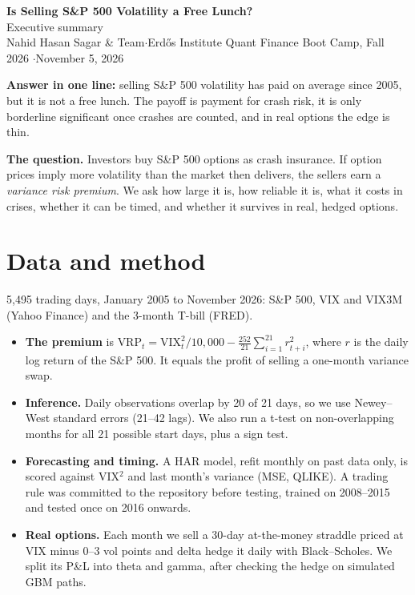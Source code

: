\documentclass[10pt]{article}
\begin{document}
\begin{center}
{\LARGE\bfseries\color{ink} Is Selling S\&P 500 Volatility a Free Lunch?}\\[4pt]
{\large Executive summary}\\[2pt]
Nahid Hasan Sagar \& Team\quad$\cdot$\quad Erd\H{o}s Institute Quant Finance Boot Camp, Fall 2026 \quad$\cdot$\quad November 5, 2026
\end{center}

\textbf{Answer in one line:} selling S\&P 500 volatility has paid on average since 2005, but it is not a free lunch. The payoff is payment for crash risk, it is only borderline significant once crashes are counted, and in real options the edge is thin.

\textbf{The question.} Investors buy S\&P 500 options as crash insurance. If option prices imply more volatility than the market then delivers, the sellers earn a \emph{variance risk premium}. We ask how large it is, how reliable it is, what it costs in crises, whether it can be timed, and whether it survives in real, hedged options.

\section*{Data and method}
5,495 trading days, January 2005 to November 2026: S\&P 500, VIX and VIX3M (Yahoo Finance) and the 3-month T-bill (FRED).
\begin{itemize}
  \item \textbf{The premium} is $\text{VRP}_t = \text{VIX}_t^2/10{,}000 - \tfrac{252}{21}\sum_{i=1}^{21} r_{t+i}^2$, where $r$ is the daily log return of the S\&P 500. It equals the profit of selling a one-month variance swap.
  \item \textbf{Inference.} Daily observations overlap by 20 of 21 days, so we use Newey--West standard errors (21--42 lags). We also run a t-test on non-overlapping months for all 21 possible start days, plus a sign test.
  \item \textbf{Forecasting and timing.} A HAR model, refit monthly on past data only, is scored against VIX$^2$ and last month's variance (MSE, QLIKE). A trading rule was committed to the repository before testing, trained on 2008--2015 and tested once on 2016 onwards.
  \item \textbf{Real options.} Each month we sell a 30-day at-the-money straddle priced at VIX minus 0--3 vol points and delta hedge it daily with Black--Scholes. We split its P\&L into theta and gamma, after checking the hedge on simulated GBM paths.
\end{itemize}
\end{document}
